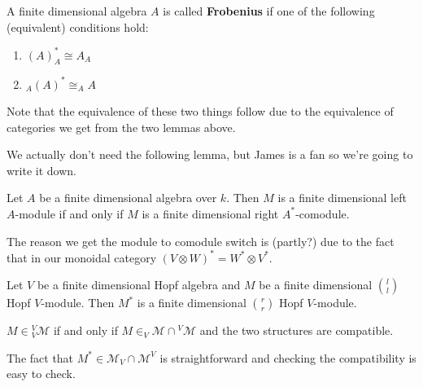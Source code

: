 \documentclass[12pt]{article}
\begin{document}
\begin{defn}
	A finite dimensional algebra $A$ is called \textbf{Frobenius} if one of the following (equivalent)
	conditions hold:
	\begin{enumerate}
		\item $(A)^*_A\cong A_A$
		\item $_A(A)^*\cong _AA$
	\end{enumerate}
\end{defn}
\begin{rmk}
	Note that the equivalence of these two things follow due to the equivalence of categories we get
	from the two lemmas above.
\end{rmk}
We actually don't need the following lemma, but James is a fan so we're going to write it down.
\begin{lem}\label{lem-not-needed}
	Let $A$ be a finite dimensional algebra over $k$. Then $M$ is a finite dimensional left $A$-module if
	and only if $M$ is a finite dimensional right $A^*$-comodule.
\end{lem}
\begin{rmk}
	The reason we get the module to comodule switch is (partly?) due to the fact that in our
	monoidal category $(V\otimes W)^*=W^*\otimes V^*.$
\end{rmk}

\begin{lem}
	Let $V$ be a finite dimensional Hopf algebra and $M$ be a finite dimensional $\binom{l}{l}$ Hopf $V$-module.
	Then $M^*$ is a finite dimensional $\binom{r}{r}$ Hopf $V$-module.
\end{lem}
\begin{prf}
	$M\in {_V^V\mathcal{M}}$ if and only if $M\in_V\mathcal{M}\cap {^V\mathcal{M}}$ and the two structures are compatible.

	The fact that $M^*\in \mathcal{M}_V\cap\mathcal{M}^V$ is straightforward and checking the compatibility is easy to check.
\end{prf}
\end{document}
